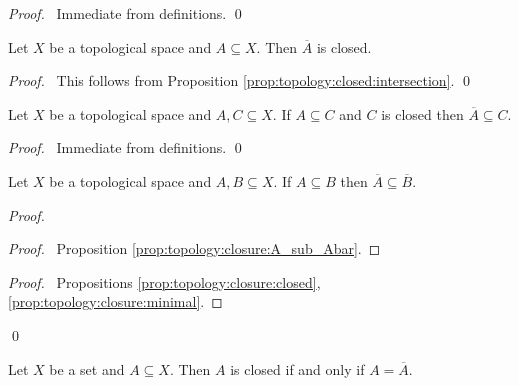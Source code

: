 \begin{proof}
  \pf\ Immediate from definitions. \qed
\end{proof}

\begin{prop}
  \label{prop:topology:closure:closed}
  Let $X$ be a topological space and $A \subseteq X$. Then $\overline{A}$ is
  closed.
\end{prop}

\begin{proof}
  \pf\ This follows from Proposition \ref{prop:topology:closed:intersection}.
  \qed
\end{proof}

\begin{prop}
  \label{prop:topology:closure:minimal}
  Let $X$ be a topological space and $A, C \subseteq X$. If $A \subseteq C$
  and $C$ is closed then $\overline{A} \subseteq C$.
\end{prop}

\begin{proof}
  \pf\ Immediate from definitions. \qed
\end{proof}

\begin{prop}
  \label{prop:topology:closure:monotone}
  Let $X$ be a topological space and $A, B \subseteq X$. If $A \subseteq B$
  then $\overline{A} \subseteq \overline{B}$.
\end{prop}

\begin{proof}
  \pf
  \begin{proof}
    \pf\ Proposition \ref{prop:topology:closure:A_sub_Abar}.
  \end{proof}
  \begin{proof}
    \pf\ Propositions \ref{prop:topology:closure:closed},
    \ref{prop:topology:closure:minimal}.
  \end{proof}
  \qed
\end{proof}

\begin{prop}
  \label{prop:topology:closure:closed2}
  Let $X$ be a set and $A \subseteq X$. Then $A$ is closed if and only if $A
  = \overline{A}$.
\end{prop}

